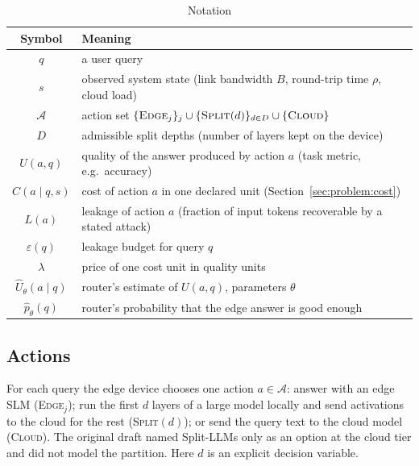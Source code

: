 \documentclass[lettersize,journal]{IEEEtran}
\newcommand{\A}{\mathcal{A}}
\begin{document}
\begin{table}[t]
\centering
\caption{Notation}
\label{tab:notation}
\begin{tabular}{cp{6.2cm}}
\hline
Symbol & Meaning \\
\hline
$q$ & a user query \\
$s$ & observed system state (link bandwidth $B$, round-trip time $\rho$, cloud load) \\
$\A$ & action set $\{\textsc{Edge}_j\}_{j} \cup \{\textsc{Split}(d)\}_{d\in D} \cup \{\textsc{Cloud}\}$ \\
$D$ & admissible split depths (number of layers kept on the device) \\
$U(a,q)$ & quality of the answer produced by action $a$ (task metric, e.g.\ accuracy) \\
$C(a\mid q,s)$ & cost of action $a$ in one declared unit (Section~\ref{sec:problem:cost}) \\
$L(a)$ & leakage of action $a$ (fraction of input tokens recoverable by a stated attack) \\
$\varepsilon(q)$ & leakage budget for query $q$ \\
$\lambda$ & price of one cost unit in quality units \\
$\hat U_\theta(a\mid q)$ & router's estimate of $U(a,q)$, parameters $\theta$ \\
$\hat p_\theta(q)$ & router's probability that the edge answer is good enough \\
\hline
\end{tabular}
\end{table}

\subsection{Actions}
For each query the edge device chooses one action $a\in\A$: answer with an edge
SLM (\textsc{Edge}$_j$); run the first $d$ layers of a large model locally and
send activations to the cloud for the rest (\textsc{Split}$(d)$); or send the
query text to the cloud model (\textsc{Cloud}). The original draft named
Split-LLMs only as an option at the cloud tier and did not model the partition.
Here $d$ is an explicit decision variable.
\end{document}
